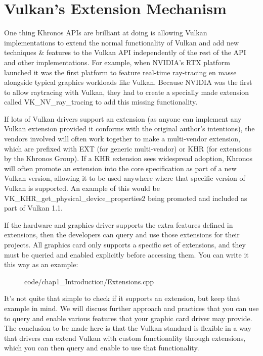 \newpage
\section{\textsf{Vulkan's Extension
Mechanism}}\label{vulkans-extension-mechanism}

One thing Khronos APIs are brilliant at doing is allowing Vulkan
implementations to extend the normal functionality of Vulkan and add new techniques \& features to the Vulkan API independently of the rest of the API and other implementations. For example, when NVIDIA's RTX platform launched it was the first platform to feature real-time ray-tracing en masse alongside typical graphics workloads like Vulkan. Because NVIDIA was the first to allow raytracing with Vulkan, they had to create a specially made extension called VK\_NV\_ray\_tracing to add this missing functionality.

If lots of Vulkan drivers support an extension (as anyone can implement any Vulkan extension provided it conforms with the original author's intentions), the vendors involved will often work together to make a multi-vendor extension, which are prefixed with EXT (for generic multi-vendor) or KHR (for extensions by the Khronos Group). If a KHR extension sees widespread adoption, Khronos will often promote an extension into the core specification as part of a new Vulkan version, allowing it to be used anywhere where that specific version of Vulkan is supported. An example of this would be VK\_KHR\_get\_physical\_device\_properties2 being promoted and included as part of Vulkan 1.1.

If the hardware and graphics driver supports the extra features defined in extensions, then the developers can query and use those extensions for their projects. All graphics card only supports a specific set of extensions, and they must be queried and enabled explicitly before accessing them. You can write it this way as an example:

\begin{figure}[ht]
    \centering
    \colorbox{backgroundcolor}{
        \parbox{0.9\textwidth}{
            
            {code/chap1_Introduction/Extensions.cpp}
        }
    }
    \label{fig:extension}
\end{figure}

It's not quite that simple to check if it supports an extension, but keep that example in mind. We will discuss further approach and practices that you can use to query and enable various features that your graphic card driver may provide. The conclusion to be made here is that the Vulkan standard is flexible in a way that drivers can extend Vulkan with custom functionality through extensions, which you can then query and enable to use that functionality.